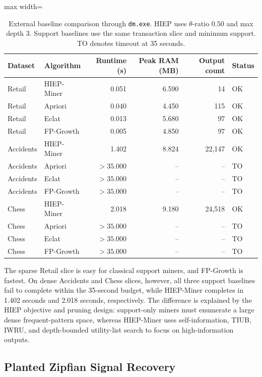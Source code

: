 \documentclass[11pt,a4paper]{article}
\begin{document}
\begin{table}[H]
\centering
\caption{External baseline comparison through \texttt{dm.exe}. HIEP uses \(\theta\)-ratio \(0.50\) and max depth 3. Support baselines use the same transaction slice and minimum support. TO denotes timeout at 35 seconds.}
\label{tab:hiep_external_baselines}
\small
\begin{adjustbox}{max width=\textwidth}
\begin{tabular}{llrrrl}
\toprule
Dataset & Algorithm & Runtime (s) & Peak RAM (MB) & Output count & Status \\
\midrule
Retail & HIEP-Miner & 0.051 & 6.590 & 14 & OK \\
Retail & Apriori & 0.040 & 4.450 & 115 & OK \\
Retail & Eclat & 0.013 & 5.680 & 97 & OK \\
Retail & FP-Growth & 0.005 & 4.850 & 97 & OK \\
\midrule
Accidents & HIEP-Miner & 1.402 & 8.824 & 22,147 & OK \\
Accidents & Apriori & \(>35.000\) & -- & -- & TO \\
Accidents & Eclat & \(>35.000\) & -- & -- & TO \\
Accidents & FP-Growth & \(>35.000\) & -- & -- & TO \\
\midrule
Chess & HIEP-Miner & 2.018 & 9.180 & 24,518 & OK \\
Chess & Apriori & \(>35.000\) & -- & -- & TO \\
Chess & Eclat & \(>35.000\) & -- & -- & TO \\
Chess & FP-Growth & \(>35.000\) & -- & -- & TO \\
\bottomrule
\end{tabular}
\end{adjustbox}
\end{table}

The sparse Retail slice is easy for classical support miners, and FP-Growth is fastest. On dense Accidents and Chess slices, however, all three support baselines fail to complete within the 35-second budget, while HIEP-Miner completes in 1.402 seconds and 2.018 seconds, respectively. The difference is explained by the HIEP objective and pruning design: support-only miners must enumerate a large dense frequent-pattern space, whereas HIEP-Miner uses self-information, TIUB, IWRU, and depth-bounded utility-list search to focus on high-information outputs.

\subsection{Planted Zipfian Signal Recovery}
\end{document}
